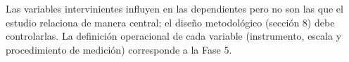 \noindent Las variables intervinientes influyen en las dependientes pero no son las que
el estudio relaciona de manera central; el diseño metodológico (sección 8) debe
controlarlas. La definición operacional de cada variable (instrumento, escala y
procedimiento de medición) corresponde a la Fase 5.
